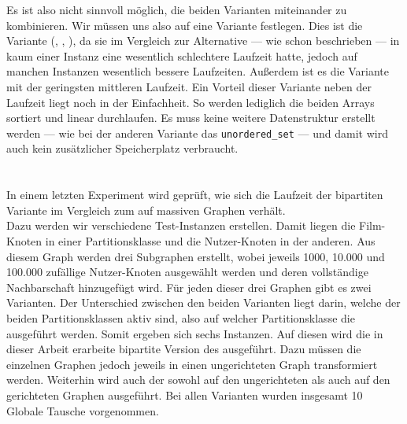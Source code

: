 Es ist also nicht sinnvoll möglich, die beiden Varianten miteinander zu kombinieren. Wir müssen uns
also auf eine Variante festlegen. Dies ist die Variante (\SorSor, \true, \distr), da sie im Vergleich zur
Alternative --- wie schon beschrieben ---
in kaum einer Instanz eine wesentlich schlechtere Laufzeit hatte, jedoch auf manchen Instanzen wesentlich
bessere Laufzeiten. Außerdem ist es die Variante mit der geringsten mittleren Laufzeit. 
Ein Vorteil dieser Variante neben der Laufzeit liegt noch in der Einfachheit. So werden
lediglich die beiden Arrays sortiert und linear durchlaufen. Es muss keine weitere Datenstruktur
erstellt werden --- wie bei der anderen Variante das \texttt{unordered\_set} --- und damit wird
auch kein zusätzlicher Speicherplatz verbraucht.




\section{}
\label{kap:result}
In einem letzten Experiment wird geprüft, wie sich die Laufzeit der bipartiten \gc{}
Variante im Vergleich zum \gc{} auf massiven Graphen verhält.
\\

Dazu werden wir verschiedene Test-Instanzen erstellen.
 Damit liegen die Film-Knoten in einer Partitionsklasse und 
die Nutzer-Knoten in der anderen.
Aus diesem Graph werden drei Subgraphen erstellt, wobei jeweils 1000, 10.000 und 100.000  zufällige
Nutzer-Knoten ausgewählt werden und deren vollständige Nachbarschaft hinzugefügt wird.
Für jeden dieser drei Graphen gibt es zwei Varianten. Der Unterschied
zwischen den beiden Varianten liegt darin, welche der beiden Partitionsklassen aktiv sind, 
also auf welcher Partitionsklasse die  ausgeführt werden.
Somit ergeben sich sechs Instanzen. Auf diesen wird 
die in dieser Arbeit erarbeite bipartite Version des \gc{} ausgeführt. Dazu müssen die
einzelnen Graphen jedoch jeweils in einen ungerichteten Graph transformiert werden.
Weiterhin wird auch der  
sowohl auf den ungerichteten als auch auf den gerichteten Graphen ausgeführt. Bei allen Varianten 
wurden insgesamt 10 Globale Tausche vorgenommen.
\\

